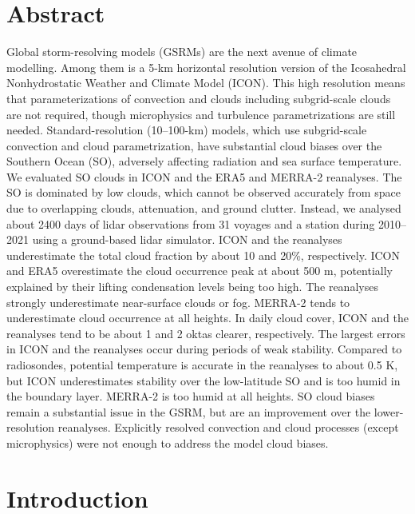 \documentclass[12pt,a4paper]{article}
\begin{document}
\section*{Abstract}

Global storm-resolving models (GSRMs) are the next avenue of climate modelling.
Among them is a 5-km horizontal resolution version of the Icosahedral Nonhydrostatic Weather and
Climate Model (ICON). This high resolution means that parameterizations of
convection and clouds including subgrid-scale clouds are not required, though microphysics and turbulence
parametrizations are still needed.  Standard-resolution (10--100-km) models, which use
subgrid-scale convection and cloud parametrization, have substantial cloud
biases over the Southern Ocean (SO), adversely affecting radiation and sea surface
temperature.  We evaluated SO clouds in ICON and the ERA5 and MERRA-2
reanalyses.  The SO is dominated by low clouds, which cannot be observed
accurately from space due to overlapping clouds, attenuation, and ground
clutter.  Instead, we analysed about 2400 days of lidar observations from 31
voyages and a station during 2010--2021 using a ground-based lidar simulator.
ICON and the reanalyses underestimate the total cloud fraction by about 10 and
20\%, respectively. ICON and ERA5 overestimate the cloud occurrence peak at
about 500 m, potentially explained by their lifting condensation levels being
too high.  The reanalyses strongly underestimate near-surface clouds or fog.
MERRA-2 tends to underestimate cloud occurrence at all heights.  In daily cloud
cover, ICON and the reanalyses tend to be about 1 and 2 oktas clearer,
respectively. The largest
errors in ICON and the reanalyses occur during periods of weak stability.  Compared to radiosondes, potential
temperature is accurate in the reanalyses to about 0.5 K, but ICON
underestimates stability over the low-latitude SO and is too humid in the boundary
layer. MERRA-2 is too humid at all heights. SO cloud biases remain a
substantial issue in the GSRM, but are an improvement over the lower-resolution
reanalyses. Explicitly resolved convection and cloud processes (except
microphysics) were not enough to address the model cloud biases.

\section{Introduction}
\label{sec:introduction}
\end{document}
